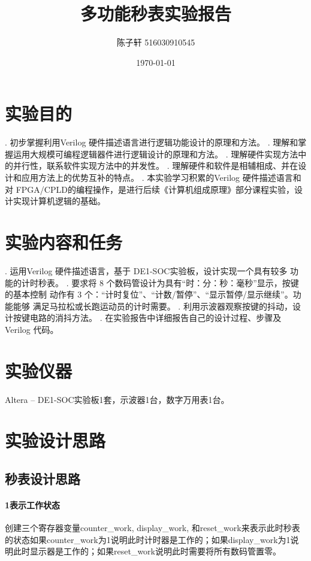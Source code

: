 \documentclass[UTF8]{ctexart}
\title{多功能秒表实验报告}
\author{陈子轩 516030910545}
\date{\today}
\begin{document}
\maketitle
\section{实验目的}
. 初步掌握利用Verilog 硬件描述语言进行逻辑功能设计的原理和方法。
. 理解和掌握运用大规模可编程逻辑器件进行逻辑设计的原理和方法。
. 理解硬件实现方法中的并行性，联系软件实现方法中的并发性。
. 理解硬件和软件是相辅相成、并在设计和应用方法上的优势互补的特点。
. 本实验学习积累的Verilog 硬件描述语言和对 FPGA/CPLD的编程操作，是进行后续《计算机组成原理》部分课程实验，设计实现计算机逻辑的基础。

\section{实验内容和任务}
. 运用Verilog 硬件描述语言，基于 DE1-SOC实验板，设计实现一个具有较多 功能的计时秒表。
. 要求将 8 个数码管设计为具有“时：分：秒：毫秒”显示，按键的基本控制 动作有 3 个：“计时复位”、“计数/暂停”、“显示暂停/显示继续”。功能能够 满足马拉松或长跑运动员的计时需要。
. 利用示波器观察按键的抖动，设计按键电路的消抖方法。
. 在实验报告中详细报告自己的设计过程、步骤及Verilog 代码。

\section{实验仪器}
Altera – DE1-SOC实验板1套，示波器1台，数字万用表1台。
\section{实验设计思路}
\subsection{秒表设计思路}
\paragraph{1表示工作状态}
创建三个寄存器变量counter\_work, display\_work, 和reset\_work来表示此时秒表的状态如果counter\_work为1说明此时计时器是工作的；如果display\_work为1说明此时显示器是工作的；如果reset\_work说明此时需要将所有数码管置零。
\end{document}

